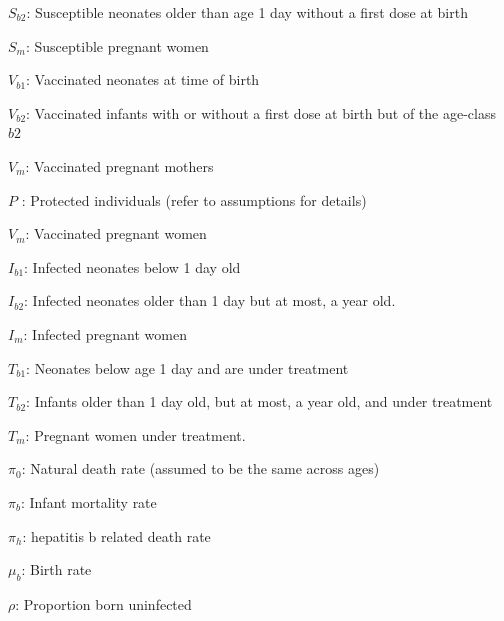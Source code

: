 \documentclass[11pt,a4paper]{article}
\begin{document}
	$S_{b2}$: Susceptible neonates older than age 1 day without a first dose at birth\vspace{1.5mm}
	
	$S_{m}$: Susceptible pregnant women\vspace{1.5mm}
	
	$V_{b1}$: Vaccinated neonates at time of birth\vspace{1.5mm}
	
	$V_{b2}$: Vaccinated infants with or without a first dose at birth but of the age-class $b2$\vspace{1.5mm}
	
	$V_{m}$: Vaccinated pregnant mothers\vspace{1.5mm}
	
	$P$   : Protected individuals (refer to assumptions for details)\vspace{1.5mm}
	
	$V_{m}$: Vaccinated pregnant women\vspace{1.5mm}
	
	$I_{b1}$: Infected neonates below 1 day old \vspace{1.5mm}
	
	$I_{b2}$: Infected neonates older than 1 day but at most, a year old. \vspace{1.5mm}
	
	$I_{m}$: Infected pregnant women\vspace{1.5mm}
	
	$T_{b1}$: Neonates below age 1 day and are under treatment\vspace{1.5mm}
	
	$T_{b2}$: Infants older than 1 day old, but at most, a year old, and under treatment \vspace{1.5mm}
	
	$T_{m}$: Pregnant women under treatment.\vspace{1.5mm}
	
	$\pi_0$: Natural death rate (assumed to be the same across ages)\vspace{1.5mm}
	
	$\pi_b$: Infant mortality rate\vspace{1.5mm}
	
	$\pi_h$: hepatitis b related death rate\vspace{1.5mm}
		
	$\mu_b$: Birth rate \vspace{1.5mm}
	
	$\rho$: Proportion born uninfected\vspace{1.5mm}
	
\end{document}
